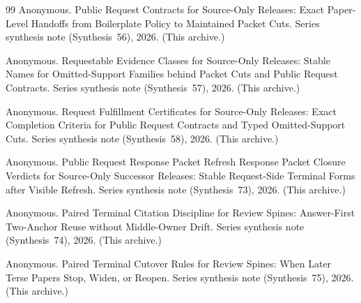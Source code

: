 \documentclass[11pt]{article}
\begin{document}
\begin{thebibliography}{99}
Anonymous.
\newblock Public Request Contracts for Source-Only Releases: Exact Paper-Level Handoffs from Boilerplate Policy to Maintained Packet Cuts.
\newblock Series synthesis note (Synthesis~56), 2026. (This archive.)

Anonymous.
\newblock Requestable Evidence Classes for Source-Only Releases: Stable Names for Omitted-Support Families behind Packet Cuts and Public Request Contracts.
\newblock Series synthesis note (Synthesis~57), 2026. (This archive.)

Anonymous.
\newblock Request Fulfillment Certificates for Source-Only Releases: Exact Completion Criteria for Public Request Contracts and Typed Omitted-Support Cuts.
\newblock Series synthesis note (Synthesis~58), 2026. (This archive.)



Anonymous.
\newblock Public Request Response Packet Refresh Response Packet Closure Verdicts for Source-Only Successor Releases: Stable Request-Side Terminal Forms after Visible Refresh.
\newblock Series synthesis note (Synthesis~73), 2026. (This archive.)

Anonymous.
\newblock Paired Terminal Citation Discipline for Review Spines: Answer-First Two-Anchor Reuse without Middle-Owner Drift.
\newblock Series synthesis note (Synthesis~74), 2026. (This archive.)

Anonymous.
\newblock Paired Terminal Cutover Rules for Review Spines: When Later Terse Papers Stop, Widen, or Reopen.
\newblock Series synthesis note (Synthesis~75), 2026. (This archive.)

\end{thebibliography}
\end{document}
